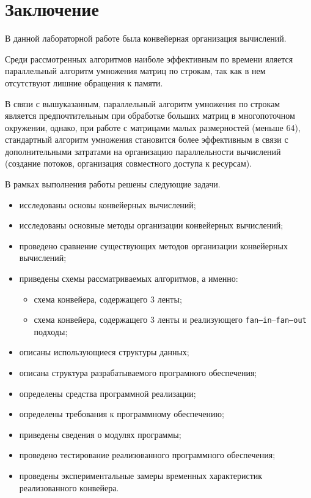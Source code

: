 \chapter*{Заключение}

В данной лабораторной работе была конвейерная организация вычислений. 

Среди рассмотренных алгоритмов наиболе эффективным по времени яляется параллельный алгоритм умножения матриц по строкам, так как в нем отсутствуют лишние обращения к памяти. 

В связи с вышуказанным, параллельный алгоритм умножения по строкам является предпочтительным при обработке больших матриц в многопоточном окружении, однако, при работе с матрицами малых размерностей (меньше 64), стандартный алгоритм умножения становится более эффективным в связи с дополнительными затратами на организацию параллельности вычислений (создание потоков, организация совместного доступа к ресурсам).

В рамках выполнения работы решены следующие задачи.
\begin{itemize}
    \item исследованы основы конвейерных вычислений; 
	\item исследованы основные методы организации конвейерных вычислений;
	\item проведено сравнение существующих методов организации конвейерных вычислений;
	\item приведены схемы рассматриваемых алгоритмов, а именно:
	\begin{itemize}
	    \item схема конвейера, содержащего 3 ленты;
	    \item схема конвейера, содержащего 3 ленты и реализующего \texttt{fan--in}--\texttt{fan--out} подходы;
	\end{itemize}
	\item описаны использующиеся структуры данных;
	\item описана структура разрабатываемого програмного обеспечения;
	\item определены средства программной реализации;
	\item определены требования к программному обеспечению;
	\item приведены сведения о модулях программы;
	\item проведено тестирование реализованного программного обеспечения;
	\item проведены экспериментальные замеры временных характеристик реализованного конвейера.
\end{itemize}